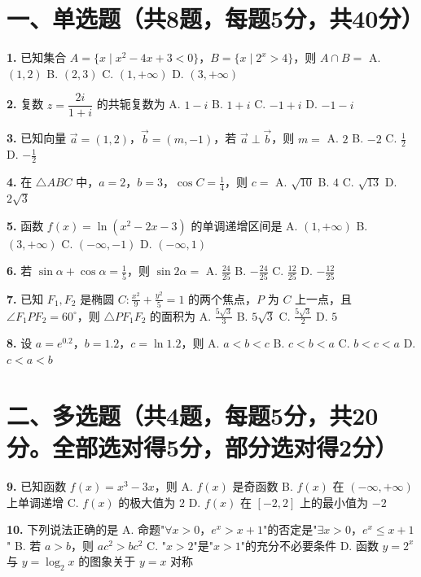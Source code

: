 \documentclass[12pt,a4paper]{ctexart}
\begin{document}
\newpage

\section*{一、单选题（共8题，每题5分，共40分）}

\textbf{1.} 已知集合 $A=\{x\mid x^2-4x+3<0\}$，$B=\{x\mid 2^x>4\}$，则 $A\cap B=$
\quad A. $(1,2)$ \quad B. $(2,3)$ \quad C. $(1,+\infty)$ \quad D. $(3,+\infty)$

\textbf{2.} 复数 $z=\dfrac{2i}{1+i}$ 的共轭复数为
\quad A. $1-i$ \quad B. $1+i$ \quad C. $-1+i$ \quad D. $-1-i$

\textbf{3.} 已知向量 $\vec{a}=(1,2)$，$\vec{b}=(m,-1)$，若 $\vec{a}\perp\vec{b}$，则 $m=$
\quad A. $2$ \quad B. $-2$ \quad C. $\frac12$ \quad D. $-\frac12$

\textbf{4.} 在 $\triangle ABC$ 中，$a=2$，$b=3$，$\cos C=\frac14$，则 $c=$
\quad A. $\sqrt{10}$ \quad B. $4$ \quad C. $\sqrt{13}$ \quad D. $2\sqrt{3}$

\textbf{5.} 函数 $f(x)=\ln(x^2-2x-3)$ 的单调递增区间是
\quad A. $(1,+\infty)$ \quad B. $(3,+\infty)$ \quad C. $(-\infty,-1)$ \quad D. $(-\infty,1)$

\textbf{6.} 若 $\sin\alpha+\cos\alpha=\frac15$，则 $\sin2\alpha=$
\quad A. $\frac{24}{25}$ \quad B. $-\frac{24}{25}$ \quad C. $\frac{12}{25}$ \quad D. $-\frac{12}{25}$

\textbf{7.} 已知 $F_1,F_2$ 是椭圆 $C:\frac{x^2}{9}+\frac{y^2}{5}=1$ 的两个焦点，$P$ 为 $C$ 上一点，且 $\angle F_1PF_2=60^\circ$，则 $\triangle PF_1F_2$ 的面积为
\quad A. $\frac{5\sqrt3}{3}$ \quad B. $5\sqrt3$ \quad C. $\frac{5\sqrt3}{2}$ \quad D. $5$

\textbf{8.} 设 $a=e^{0.2}$，$b=1.2$，$c=\ln1.2$，则
\quad A. $a<b<c$ \quad B. $c<b<a$ \quad C. $b<c<a$ \quad D. $c<a<b$

\section*{二、多选题（共4题，每题5分，共20分。全部选对得5分，部分选对得2分）}

\textbf{9.} 已知函数 $f(x)=x^3-3x$，则
\quad A. $f(x)$ 是奇函数 \quad B. $f(x)$ 在 $(-\infty,+\infty)$ 上单调递增
\quad C. $f(x)$ 的极大值为 $2$ \quad D. $f(x)$ 在 $[-2,2]$ 上的最小值为 $-2$

\textbf{10.} 下列说法正确的是
\quad A. 命题"$\forall x>0$，$e^x>x+1$"的否定是"$\exists x>0$，$e^x\le x+1$"
\quad B. 若 $a>b$，则 $ac^2>bc^2$
\quad C. "$x>2$"是"$x>1$"的充分不必要条件
\quad D. 函数 $y=2^x$ 与 $y=\log_2 x$ 的图象关于 $y=x$ 对称
\end{document}
